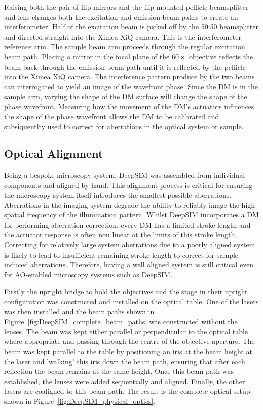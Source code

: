 Raising both the  pair of flip mirrors and the  flip mounted pellicle beamsplitter and lens changes both the excitation and emission beam paths to create an interferometer. Half of the excitation beam is picked off by the 50:50 beamsplitter and directed straight into the Ximea XiQ camera. This is the interferometer reference arm. The sample beam arm proceeds through the regular excitation beam path. Placing a mirror in the focal plane of the $60\times$ objective reflects the beam back through the emission beam path until it is reflected by the pellicle into the Ximea XiQ camera. The interference pattern produce by the two beams can interrogated to yield an image of the wavefront phase. Since the DM is in the sample arm, varying the shape of the DM surface will change the shape of the phase wavefront. Measuring how the movement of the DM's actuators influences the shape of the phase wavefront allows the DM to be calibrated and subsiquentlty used to correct for aberrations in the optical system or sample. 

\subsection{Optical Alignment}
\label{subsec:alignment}

Being a bespoke microscopy system, DeepSIM was assembled from individual components and aligned by hand. This alignment process is critical for ensuring the microscopy system itself introduces the smallest possible aberrations. Aberrations in the imaging system degrade the ability to reliably image the high spatial frequency of the illumination pattern.\cite{debarre2008adaptive,booth2015aberrations} Whilst DeepSIM incorporates a DM for performing aberration correction, every DM has a limited stroke length and the actuator response is often non linear at the limits of this stroke length. Correcting for relatively large system aberrations due to a poorly aligned system is likely to lead to insufficient remaining stroke length to correct for sample induced aberrations. Therefore, having a well aligned system is still critical even for AO-enabled microscopy systems such as DeepSIM.

Firstly the upright bridge to hold the objectives and the stage in their upright configuration was constructed and installed on the optical table. One of the lasers was then installed and the beam paths shown in Figure~\ref{fig:DeepSIM_complete_beam_paths} was constructed without the lenses. The beam was kept either parallel or perpendicular to the optical table where appropriate and passing through the centre of the objective aperture. The beam was kept parallel to the table by positioning an iris at the beam height at the laser and 'walking' this iris down the beam path, ensuring that after each reflection the beam remains at the same height. Once this beam path was established, the lenses were added sequentially and aligned. Finally, the other lasers are coaligned to this beam path. The result is the complete optical setup shown in Figure~\ref{fig:DeepSIM_physical_optics}.

